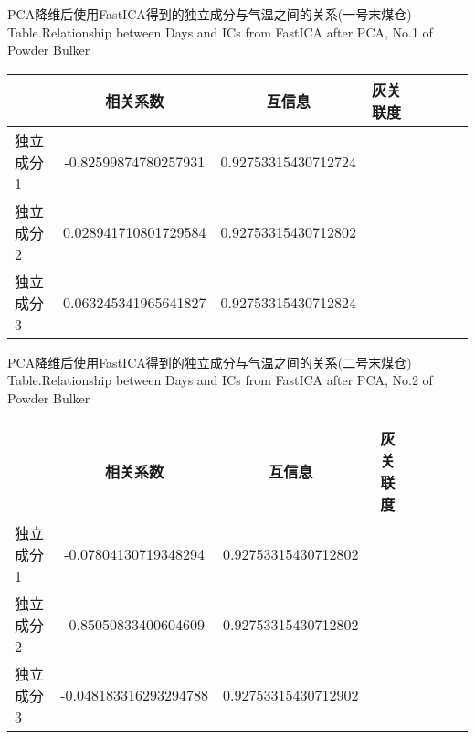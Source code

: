 \begin{table}[!h]
\begin{center}
			{PCA降维后使用FastICA得到的独立成分与气温之间的关系(一号末煤仓)}
			{Table.}{Relationship between Days and ICs from FastICA after PCA, No.1 of Powder Bulker}
\begin{tabular}{lccclccc}
\toprule
                & 相关系数     				& 互信息      			&灰关联度 \\
\midrule
  独立成分1     &  -0.82599874780257931		& 0.92753315430712724   &     \\
  独立成分2     &  0.028941710801729584		& 0.92753315430712802   &     \\
  独立成分3     &  0.063245341965641827		& 0.92753315430712824   &      \\
 \bottomrule
\end{tabular}
\end{center}
\end{table}

\begin{table}[!h]
\begin{center}
			{PCA降维后使用FastICA得到的独立成分与气温之间的关系(二号末煤仓)}
			{Table.}{Relationship between Days and ICs from FastICA after PCA, No.2 of Powder Bulker}
\begin{tabular}{lccclccc}
\toprule
                & 相关系数     				& 互信息      			&灰关联度 \\
\midrule
  独立成分1     &  -0.07804130719348294		& 0.92753315430712802	&    \\
  独立成分2     &  -0.85050833400604609		& 0.92753315430712802	&    \\
  独立成分3     &  -0.048183316293294788		& 0.92753315430712902	&    \\
 \bottomrule
\end{tabular}
\end{center}
\end{table}


